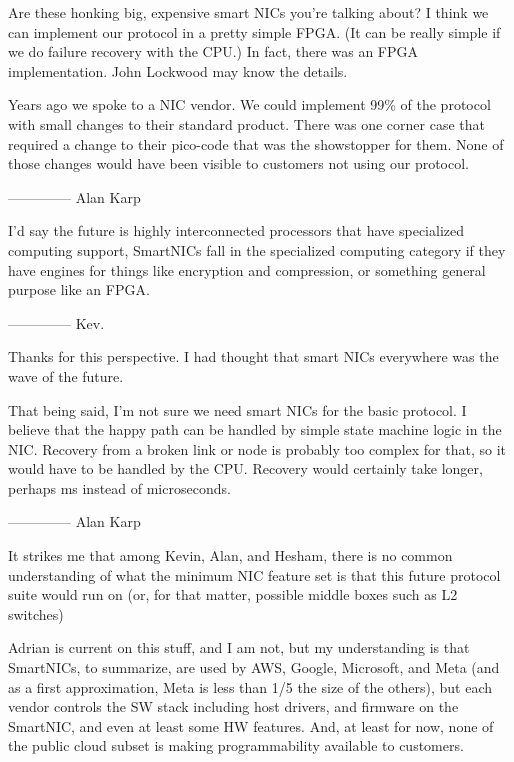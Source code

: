 Are these honking big, expensive smart NICs you're talking about?  I think we can implement our protocol in a pretty simple FPGA.  (It can be really simple if we do failure recovery with the CPU.)  In fact, there was an FPGA implementation.  John Lockwood may know the details.
 
Years ago we spoke to a NIC vendor.  We could implement 99\% of the protocol with small changes to their standard product.  There was one corner case that required a change to their pico-code that was the showstopper for them.  None of those changes would have been visible to customers not using our protocol.

--------------
Alan Karp
 
\bigskip


I'd say the future is highly interconnected processors that have specialized computing support, SmartNICs fall in the specialized computing category if they have engines for things like encryption and compression, or something general purpose like an FPGA.

--------------
Kev.

\bigskip

Thanks for this perspective.  I had thought that smart NICs everywhere was the wave of the future.

That being said, I'm not sure we need smart NICs for the basic protocol.  I believe that the happy path can be handled by simple state machine logic in the NIC.  Recovery from a broken link or node is probably too complex for that, so it would have to be handled by the CPU.  Recovery would certainly take longer, perhaps ms instead of microseconds.

--------------
Alan Karp


It strikes me that among Kevin, Alan, and Hesham, there is no common understanding of what the minimum NIC feature set is that this future protocol suite would run on  (or, for that matter, possible middle boxes such as L2 switches)

Adrian is current on this stuff, and I am not, but my understanding is that SmartNICs, to summarize, are used by AWS, Google, Microsoft, and Meta (and as a first approximation, Meta is less than 1/5 the size of the others), but each vendor controls the SW stack including host drivers, and firmware on the SmartNIC, and even at least some HW features. And, at least for now, none of the public cloud subset is making programmability available to customers.

